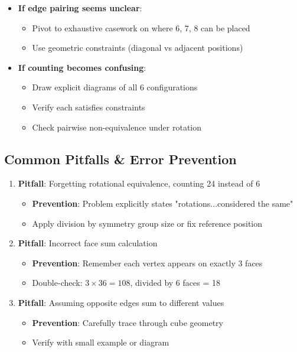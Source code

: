 \documentclass[]{article}
\begin{document}
\begin{solutionbox}
\begin{itemize}[leftmargin=*]
    \item \textbf{If edge pairing seems unclear}:
    \begin{itemize}
        \item Pivot to exhaustive casework on where 6, 7, 8 can be placed
        \item Use geometric constraints (diagonal vs adjacent positions)
    \end{itemize}
    
    \item \textbf{If counting becomes confusing}:
    \begin{itemize}
        \item Draw explicit diagrams of all 6 configurations
        \item Verify each satisfies constraints
        \item Check pairwise non-equivalence under rotation
    \end{itemize}
\end{itemize}

\subsection*{Common Pitfalls \& Error Prevention}
\begin{enumerate}[leftmargin=*]
    \item \textbf{Pitfall}: Forgetting rotational equivalence, counting 24 instead of 6
    \begin{itemize}
        \item \textbf{Prevention}: Problem explicitly states "rotations...considered the same"
        \item Apply division by symmetry group size or fix reference position
    \end{itemize}
    
    \item \textbf{Pitfall}: Incorrect face sum calculation
    \begin{itemize}
        \item \textbf{Prevention}: Remember each vertex appears on exactly 3 faces
        \item Double-check: $3 \times 36 = 108$, divided by 6 faces = 18
    \end{itemize}
    
    \item \textbf{Pitfall}: Assuming opposite edges sum to different values
    \begin{itemize}
        \item \textbf{Prevention}: Carefully trace through cube geometry
        \item Verify with small example or diagram
    \end{itemize}
    

\end{enumerate}
\end{solutionbox}
\end{document}

